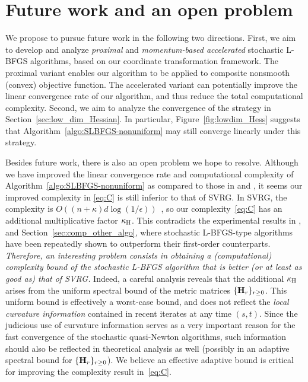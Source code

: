 \documentclass[10pt,twocolumn,journal]{IEEEtran}
\begin{document}
\section{Future work and an open problem }\label{sec:future_work}  %
We propose to pursue future work in the following two directions.
First, we aim to develop and analyze {\em proximal} and {\em momentum-based accelerated} stochastic L-BFGS algorithms, based on our coordinate transformation framework. The proximal variant enables our algorithm to be applied to composite nonsmooth (convex) objective function. %
The accelerated variant can potentially improve the linear convergence rate of our algorithm, and thus reduce the total computational complexity. 
Second, we aim to analyze the convergence of the strategy in Section~\ref{sec:low_dim_Hessian}. %
In particular, Figure~\ref{fig:lowdim_Hess} suggests that Algorithm~\ref{algo:SLBFGS-nonuniform} may still converge linearly under this strategy. %

Besides future work, there is also an open problem we hope to resolve. Although we have improved the linear convergence rate and computational complexity of Algorithm~\ref{algo:SLBFGS-nonuniform} as compared to those in \cite{Moritz_16} and \cite{Gower_16},  it seems our improved complexity in \eqref{eq:C} is still inferior to that of SVRG. In SVRG, the complexity is $O((n+\kappa)d\log(1/\epsilon))$~\cite{Xiao_14}, so our complexity~\eqref{eq:C} has an additional multiplicative factor $\kappa_{\mathrm{H}}$. This contradicts the experimental results in \cite{Moritz_16}, \cite{Gower_16} and Section~\ref{sec:comp_other_algo}, where stochastic L-BFGS-type algorithms have been repeatedly shown to outperform their first-order counterparts. {\em Therefore,  an interesting problem consists in  obtaining a (computational) complexity bound of the stochastic L-BFGS algorithm that is better (or at least as good as) that of SVRG. }
Indeed, a careful analysis   reveals that the additional $\kappa_{\mathrm{H}}$ arises from the uniform spectral bound of the metric matrices $\{\mathbf{H}_r\}_{r\ge 0}$. This uniform bound is effectively a worst-case bound, and does not reflect the {\em local curvature information} contained in recent iterates at any time $(s,t)$. Since the judicious use of curvature information serves as a very important reason for the fast convergence of the stochastic quasi-Newton algorithms, %
such information should also be reflected in theoretical analysis as well (possibly in an adaptive spectral bound for $\{\mathbf{H}_r\}_{r\ge 0}$). We believe an effective adaptive bound is critical for improving the   complexity result in~\eqref{eq:C}. 
\end{document}
